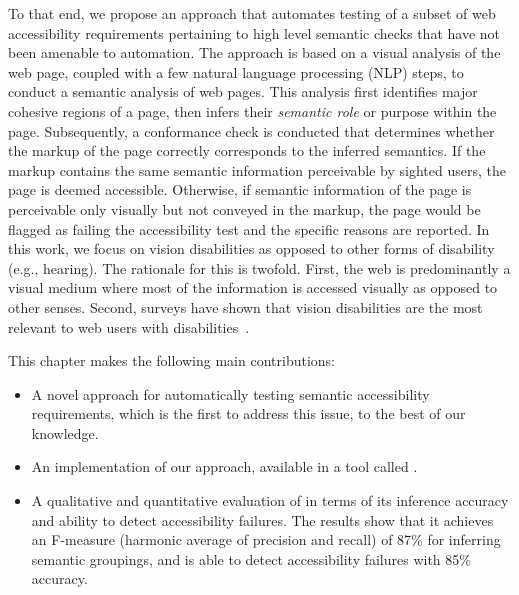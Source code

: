 To that end, we propose an approach that 
automates testing of a subset of web accessibility 
requirements pertaining to high level 
semantic checks that have not been amenable to automation. 
The approach is based on a visual analysis of the web page, 
coupled with a few natural language processing (NLP) steps, 
to conduct a semantic analysis of web pages. 
This analysis first identifies major cohesive regions of a 
page, then infers their 
\emph{semantic role} or purpose within the page.
Subsequently, a conformance check is conducted that determines 
whether the markup of the page correctly corresponds to the inferred semantics.  
If the markup contains the same semantic information perceivable by sighted users, 
the page is deemed accessible. Otherwise, if semantic information of the page is 
perceivable only visually but not conveyed in the markup, 
the page would be flagged as failing the accessibility test 
and the specific reasons are reported.   
In this work, we focus on vision disabilities as opposed to other forms 
of disability (e.g., hearing). The rationale for this is twofold. 
First, the web is predominantly a visual medium where most of the 
information is accessed visually as opposed to other senses. 
Second, surveys have shown that vision disabilities are the most relevant 
to web users with disabilities~\cite{2019users_survey}.

This chapter makes the following main contributions:
\begin{itemize}
    \item A novel approach for automatically testing semantic accessibility 
    requirements, which is the first to address this issue, to the best of our knowledge.
	\item An implementation of our approach, available in a tool called \toolname.
    \item A qualitative and quantitative evaluation of \toolname in terms of its 
    inference accuracy and ability to detect accessibility failures. 
    The results show that it achieves an F-measure (harmonic average of precision and recall) of 87\% for inferring semantic groupings, and is able to detect accessibility failures with 85\% accuracy. 
\end{itemize}


